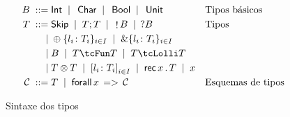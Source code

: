 
\begin{figure}[ht]
  \begin{align*}
    \tcBase \grmeq & \inte \grmor \, \chare \grmor \, \boole \grmor \, \unite && \text{Tipos básicos}\\
    T \grmeq       & \tskip \grmor \tSemi{T}{T} \grmor \,\tOut{\tcBase} \grmor \,\tIn{\tcBase} && \text{Tipos}\\
    \grmor         & \tIChoice\{l_i\colon T_i\}_{i\in I} \grmor \tEChoice\{l_i\colon T_i\}_{i\in I} \\ 
    \grmor         & \tcBase \grmor \tUnFun{T}{T} \grmor \tLinFun{T}{T}\\   
    \grmor         & \tPair{T}{T} \grmor \tDatatype{l_i\colon T_i}_{i\in I} \grmor \tRec{x}{T} \grmor x\\
    \kindsch \grmeq & T \grmor \tForall{x}{\kindsch}  && \text{Esquemas de tipos}
  \end{align*}
  \hrulefill
  \caption{Sintaxe dos tipos}
  \label{fig:types}
\end{figure}


